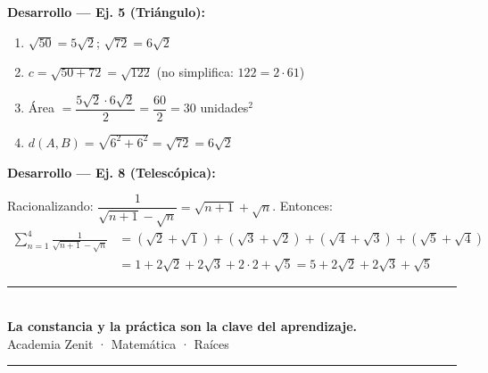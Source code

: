 \documentclass[11pt, letterpaper]{article}
\begin{document}
\begin{tcolorbox}[answerbox, title={Respuestas de algunos ejercicios finales}]
\medskip
\textbf{Desarrollo — Ej. 5 (Triángulo):}
\begin{enumerate}[label=\alph*)]
  \item $\sqrt{50}=5\sqrt{2}$; $\sqrt{72}=6\sqrt{2}$
  \item $c=\sqrt{50+72}=\sqrt{122}$ (no simplifica: $122=2\cdot 61$)
  \item Área $=\dfrac{5\sqrt{2}\cdot 6\sqrt{2}}{2}=\dfrac{60}{2}=30$ unidades$^2$
  \item $d(A,B)=\sqrt{6^2+6^2}=\sqrt{72}=6\sqrt{2}$ \checkmark
\end{enumerate}

\medskip
\textbf{Desarrollo — Ej. 8 (Telescópica):}

Racionalizando: $\dfrac{1}{\sqrt{n+1}-\sqrt{n}} = \sqrt{n+1}+\sqrt{n}$. Entonces:
\begin{align*}
\sum_{n=1}^{4}\frac{1}{\sqrt{n+1}-\sqrt{n}}
&=(\sqrt{2}+\sqrt{1})+(\sqrt{3}+\sqrt{2})+(\sqrt{4}+\sqrt{3})+(\sqrt{5}+\sqrt{4})\\
&=1+2\sqrt{2}+2\sqrt{3}+2\cdot 2+\sqrt{5} = 5+2\sqrt{2}+2\sqrt{3}+\sqrt{5}
\end{align*}
\end{tcolorbox}

\vspace{8pt}
\begin{center}
  \rule{\linewidth}{1.5pt}\\[4pt]
  {\large\bfseries\color{zenitnavy} La constancia y la práctica son la clave del aprendizaje.}\\[2pt]
  {\color{zenitgold}\small Academia Zenit · Matemática · Raíces}
  \rule{\linewidth}{1.5pt}
\end{center}
\end{document}
